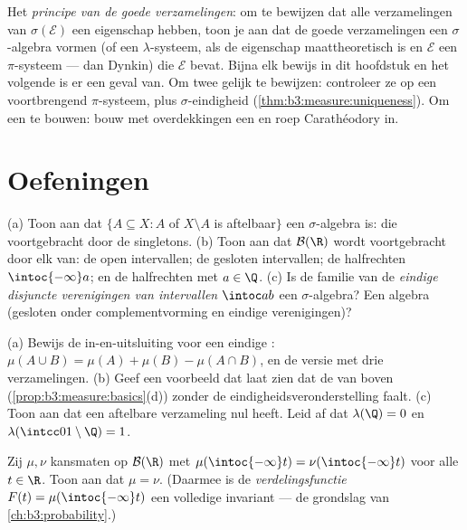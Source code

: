 \begin{method}\label{met:b3:measure:goodsets}
Het \emph{principe van de goede verzamelingen}: om te bewijzen dat
alle verzamelingen van $\sigma(\mathcal E)$ een eigenschap hebben,
toon je aan dat de goede verzamelingen een $\sigma$-algebra vormen
(of een $\lambda$-systeem, als de eigenschap maattheoretisch is en
$\mathcal E$ een $\pi$-systeem --- dan Dynkin) die $\mathcal E$
bevat. Bijna elk bewijs in dit hoofdstuk en het volgende is er een
geval van. Om twee  gelijk te bewijzen: controleer ze op een
voortbrengend $\pi$-systeem, plus $\sigma$-eindigheid
(\cref{thm:b3:measure:uniqueness}). Om een  te bouwen: bouw
met overdekkingen een  en roep Carathéodory in.
\end{method}

\section{Oefeningen}

\begin{exercise}[$\star$]\label{exo:b3:measure:1}
(a) Toon aan dat $\{A \subseteq X : A$ of $X\setminus A$ is
aftelbaar$\}$ een $\sigma$-algebra is: die voortgebracht door de
singletons.
(b) Toon aan dat $\mathcal B(\R)$ wordt voortgebracht door elk
van: de open intervallen; de gesloten intervallen; de halfrechten
$\intoc{-\infty}a$; en de halfrechten met $a \in \Q$.
(c) Is de familie van de \emph{eindige disjuncte verenigingen van
intervallen} $\intoc ab$ een $\sigma$-algebra? Een algebra
(gesloten onder complementvorming en eindige verenigingen)?
\end{exercise}

\begin{exercise}[$\star$]\label{exo:b3:measure:2}
(a) Bewijs de in-en-uitsluiting voor een eindige : $\mu(A\cup
B) = \mu(A) + \mu(B) - \mu(A\cap B)$, en de versie met drie
verzamelingen.
(b) Geef een voorbeeld dat laat zien dat de  van boven
(\cref{prop:b3:measure:basics}(d)) zonder de
eindigheidsveronderstelling faalt.
(c) Toon aan dat een aftelbare verzameling  nul heeft.
Leid af dat $\lambda(\Q) = 0$ en $\lambda(\intcc01\setminus\Q) =
1$.
\end{exercise}

\begin{exercise}[$\star\star$]\label{exo:b3:measure:3}
Zij $\mu, \nu$ kansmaten op $\mathcal B(\R)$ met
$\mu(\intoc{-\infty}t) = \nu(\intoc{-\infty}t)$ voor alle $t \in
\R$. Toon aan dat $\mu = \nu$. (Daarmee is de
\emph{verdelingsfunctie} $F(t) = \mu(\intoc{-\infty}t)$ een
volledige invariant --- de grondslag van
\cref{ch:b3:probability}.)
\end{exercise}

